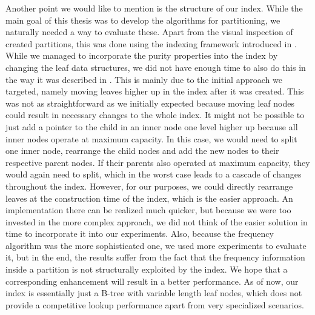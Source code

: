 Another point we would like to mention is the structure of our index. While the main goal of this thesis was to develop the algorithms for partitioning, we naturally needed a way to evaluate these. Apart from the visual inspection of created partitions, this was done using the indexing framework introduced in \cite{Dittrich2021}. While we managed to incorporate the purity properties into the index by changing the leaf data structures, we did not have enough time to also do this in the way it was described in . This is mainly due to the initial approach we targeted, namely moving leaves higher up in the index after it was created. This was not as straightforward as we initially expected because moving leaf nodes could result in necessary changes to the whole index. It might not be possible to just add a pointer to the child in an inner node one level higher up because all inner nodes operate at maximum capacity. In this case, we would need to split one inner node, rearrange the child nodes and add the new nodes to their respective parent nodes. If their parents also operated at maximum capacity, they would again need to split, which in the worst case leads to a cascade of changes throughout the index. However, for our purposes, we could directly rearrange leaves at the construction time of the index, which is the easier approach. An implementation there can be realized much quicker, but because we were too invested in the more complex approach, we did not think of the easier solution in time to incorporate it into our experiments. Also, because the frequency algorithm was the more sophisticated one, we used more experiments to evaluate it, but in the end, the results suffer from the fact that the frequency information inside a partition is not structurally exploited by the index. We hope that a corresponding enhancement will result in a better performance. As of now, our index is essentially just a B-tree with variable length leaf nodes, which does not provide a competitive lookup performance apart from very specialized scenarios. 

